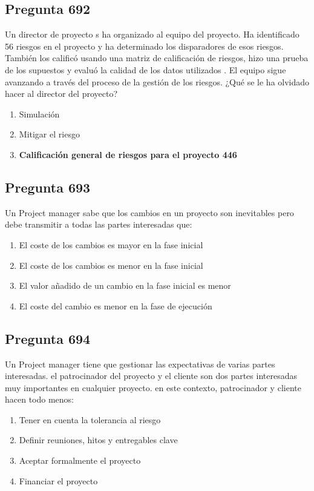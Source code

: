 \documentclass[11pt,a4paper]{article}
\begin{document}
\subsection*{Pregunta 692}
Un director de proyecto s ha organizado al equipo del proyecto. Ha identificado 56 riesgos en el proyecto y ha determinado los disparadores de esos riesgos. También los calificó usando una matriz de calificación de riesgos, hizo una prueba de los supuestos y evaluó la calidad de los datos utilizados . El equipo sigue avanzando a través del proceso de la gestión de los riesgos. ¿Qué se le ha olvidado hacer al director del proyecto?

\begin{enumerate}[label=\alph*)]
  \item Simulación
  \item Mitigar el riesgo
  \item \textbf{Calificación general de riesgos para el proyecto 446}
\end{enumerate}

\subsection*{Pregunta 693}
Un Project manager sabe que los cambios en un proyecto son inevitables pero debe transmitir a todas las partes interesadas que:

\begin{enumerate}[label=\alph*)]
  \item El coste de los cambios es mayor en la fase inicial
  \item El coste de los cambios es menor en la fase inicial
  \item El valor añadido de un cambio en la fase inicial es menor
  \item El coste del cambio es menor en la fase de ejecución
\end{enumerate}

\subsection*{Pregunta 694}
Un Project manager tiene que gestionar las expectativas de varias partes interesadas. el patrocinador del proyecto y el cliente son dos partes interesadas muy importantes en cualquier proyecto. en este contexto, patrocinador y cliente hacen todo menos:

\begin{enumerate}[label=\alph*)]
  \item Tener en cuenta la tolerancia al riesgo
  \item Definir reuniones, hitos y entregables clave
  \item Aceptar formalmente el proyecto
  \item Financiar el proyecto
\end{enumerate}
\end{document}
